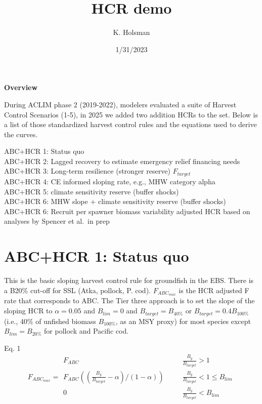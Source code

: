 \documentclass[
]{article}
\title{HCR demo}
\author{K. Holsman}
\date{1/31/2023}
\begin{document}
\maketitle

{
\setcounter{tocdepth}{3}
\tableofcontents
}
\textbf{Overview}

During ACLIM phase 2 (2019-2022), modelers evaluated a suite of Harvest
Control Scenarios (1-5), in 2025 we added two addition HCRs to the set.
Below is a list of those standardized harvest control rules and the
equations used to derive the curves.

ABC+HCR 1: Status quo\\
ABC+HCR 2: Lagged recovery to estimate emergency relief financing
needs\\
ABC+HCR 3: Long-term resilience (stronger reserve) \(F_{target}\)\\
ABC+HCR 4: CE informed sloping rate, e.g., MHW category alpha\\
ABC+HCR 5: climate sensitivity reserve (buffer shocks)\\
ABC+HCR 6: MHW slope + climate sensitivity reserve (buffer shocks)\\
ABC+HCR 6: Recruit per spawner biomass variability adjusted HCR based on
analyses by Spencer et al.~in prep

\section{ABC+HCR 1: Status quo}\label{abchcr-1-status-quo}

This is the basic sloping harvest control rule for groundfish in the
EBS. There is a B20\% cut-off for SSL (Atka, pollock, P. cod).
\(F_{ABC_{max}}\) is the HCR adjusted F rate that corresponds to ABC.
The Tier three approach is to set the slope of the sloping HCR to
\(\alpha = 0.05\) and \(B_{lim} = 0\) and \(B_{target} = B_{40\%}\) or
\(B_{target} = 0.4B_{100\%}\) (i.e., 40\% of unfished biomass
\(B_{100\%}\), as an MSY proxy) for most species except
\(B_{lim} = B_{20\%}\) for pollock and Pacific cod.

Eq. 1 \[F_{ABC_{max}} = \begin{array}{ll}  
 F_{ABC} &~~~~~~~~ \frac{B_y}{B_{target}}>1 \\  
 F_{ABC}((\frac{B_y}{B_{target}}-\alpha)/(1-\alpha)) &~~~~~~~~ \frac{B_y}{B_{target}} < 1 \leq B_{lim} \\  
 0 &~~~~~~~~ \frac{B_y}{B_{target}} < B_{lim}  
 \end{array}\]
\end{document}
